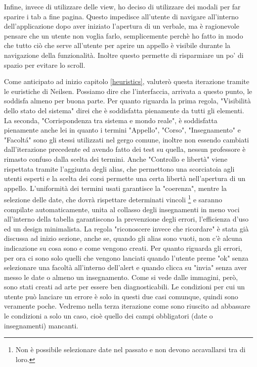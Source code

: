 \documentclass[Lau, oneside, noexaminfo]{sapthesis}%
\begin{document}
Infine, invece di utilizzare delle view, ho deciso di utilizzare dei modali per far sparire i tab a fine pagina. Questo impedisce all'utente di navigare all'interno dell'applicazione dopo aver iniziato l'apertura di un verbale, ma è ragionevole pensare che un utente non voglia farlo, semplicemente perchè ho fatto in modo che tutto ciò che serve all'utente per aprire un appello è visibile durante la navigazione della funzionalità. Inoltre questo permette di risparmiare un po' di spazio per evitare lo scroll.

Come anticipato ad inizio capitolo \ref{heuristics}, valuterò questa iterazione tramite le euristiche di Neilsen. Possiamo dire che l'interfaccia, arrivata a questo punto, le soddisfa almeno per buona parte.
Per quanto riguarda la prima regola, "Visibilità dello stato del sistema" direi che è soddisfatta pienamente da tutti gli elementi. La seconda, "Corrispondenza tra sistema e mondo reale", è soddisfatta pienamente anche lei in quanto i termini "Appello", "Corso", "Insegnamento" e "Facolt\'a" sono gli stessi utilizzati nel gergo comune, inoltre non essendo cambiati dall'iterazione precedente ed avendo fatto dei test su quella, nessun professore è rimasto confuso dalla scelta dei termini. Anche "Controllo e libertà" viene rispettata tramite l'aggiunta degli alias, che permettono una scorciatoia agli utenti esperti e la scelta dei corsi permette una certa libertà nell'apertura di un appello. L'uniformità dei termini usati garantisce la "coerenza", mentre la selezione delle date, che dovrà rispettare determinati vincoli \footnote{Non è possibile selezionare date nel passato e non devono accavallarsi tra di loro.} e saranno compilate automaticamente, unita al collasso degli insegnamenti in meno voci all'interno della tabella garantiscono la prevenzione degli errori, l'efficienza d'uso ed un design minimalista. La regola "riconoscere invece che ricordare" è stata già discussa ad inizio sezione, anche se, quando gli alias sono vuoti, non c'è alcuna indicazione su cosa sono e come vengono creati. Per quanto riguarda gli errori, per ora ci sono solo quelli che vengono lanciati quando l'utente preme "ok" senza selezionare una facoltà all'interno dell'alert e quando clicca su "invia" senza aver messo le date o almeno un insegnamento. Come si vede dalle immagini, però, sono stati creati ad arte per essere ben diagnosticabili. Le condizioni per cui un utente può lanciare un errore è solo in questi due casi comunque, quindi sono veramente poche. Vedremo nella terza iterazione come sono riuscito ad abbassare le condizioni a solo un caso, cioè quello dei campi obbligatori (date o insegnamenti) mancanti.
\end{document}
